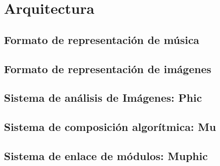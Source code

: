 \section{Arquitectura}

\subsection{Formato de representación de música}


\subsection{Formato de representación de imágenes}


\subsection{Sistema de análisis de Imágenes: Phic}

\subsection{Sistema de composición algorítmica: Mu}

\subsection{Sistema de enlace de módulos: Muphic}

